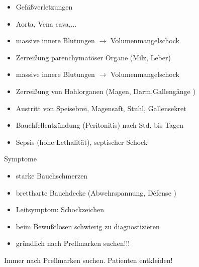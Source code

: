 \documentclass{article}
\begin{document}
\begin{itemize}
\item Gef\"a{\ss}verletzungen

\end{itemize}
\begin{itemize}
\item Aorta, Vena cava,...

\item massive innere Blutungen ${\rightarrow}$ Volumenmangelschock

\end{itemize}
\begin{itemize}
\item Zerrei{\ss}ung  parenchymat\"oser Organe (Milz, Leber)

\end{itemize}
\begin{itemize}
\item massive innere Blutungen ${\rightarrow}$ Volumenmangelschock

\end{itemize}
\begin{itemize}
\item Zerrei{\ss}ung  von Hohlorganen (Magen, Darm,Galleng\"ange )

\end{itemize}
\begin{itemize}
\item Austritt von Speisebrei, Magensaft, Stuhl, Gallensekret

\end{itemize}
\begin{itemize}
\item Bauchfellentz\"undung (Peritonitis) nach Std. bis  Tagen

\item Sepsis (hohe Lethalit\"at), septischer Schock

\end{itemize}
Symptome

\begin{itemize}
\item starke  Bauchschmerzen

\item brettharte  Bauchdecke  (Abwehrspannung, D\'efense )

\item Leitsymptom: Schockzeichen

\item beim Bewu{\ss}tlosen schwierig zu  diagnostizieren

\end{itemize}
\begin{itemize}
\item gr\"undlich nach Prellmarken suchen!!!

\end{itemize}
Immer nach Prellmarken suchen. Patienten entkleiden!
\end{document}
